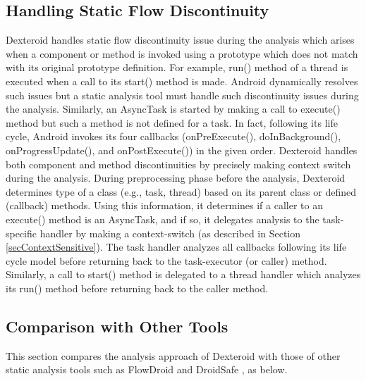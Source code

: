 \documentclass[10pt]{elsarticle}
\begin{document}
\subsection {Handling Static Flow Discontinuity} \label{handlingAPIs}

Dexteroid handles static flow discontinuity issue \cite{staticDiscontinuity} during the analysis which arises when a component or method is invoked using a prototype which does not match with its original prototype definition. For example, {\ttfamily run()} method of a thread is executed when a call to its {\ttfamily start()} method is made. Android dynamically resolves such issues but a static analysis tool must handle such discontinuity issues during the analysis. Similarly, an {\ttfamily AsyncTask} \cite{asynchTask} is started by making a call to {\ttfamily execute()} method but such a method is not defined for a task. In fact, following its life cycle, Android invokes its four callbacks ({\ttfamily onPreExecute()}, {\ttfamily doInBackground()}, {\ttfamily onProgressUpdate()}, and {\ttfamily onPostExecute()}) in the given order. Dexteroid handles both component and method discontinuities by precisely making context switch during the analysis. During preprocessing phase before the analysis, Dexteroid determines type of a class (e.g., task, thread) based on its parent class or defined (callback) methods. Using this information, it determines if a caller to an {\ttfamily execute()} method is an {\ttfamily AsyncTask}, and if so, it delegates analysis to the task-specific handler by making a context-switch (as described in Section \ref{secContextSensitive}). The task handler analyzes all callbacks following its life cycle model before returning back to the task-executor (or caller) method. Similarly, a call to {\ttfamily start()} method is delegated to a thread handler which analyzes its {\ttfamily run()} method before returning back to the caller method.

\subsection{Comparison with Other Tools} \label{secComparison}

This section compares the analysis approach of Dexteroid with those of other static analysis tools such as FlowDroid \cite{FlowDroid} and DroidSafe \cite{DroidSafe}, as below.
\end{document}
